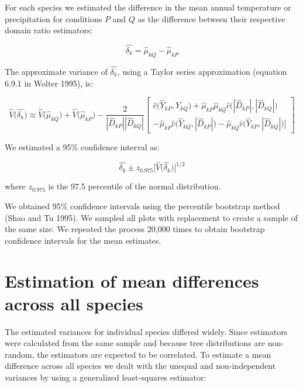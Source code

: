 \documentclass[12pt]{article}
\begin{document}
For each species we estimated the difference in the mean annual temperature or precipitation for conditions $P$ and $Q$ as the difference between their respective domain ratio estimators:

 \begin{equation} \label{eq:delta}
\hat{\delta_k} = \hat\mu_{kQ} - \hat\mu_{kP}
\end{equation}

The approximate variance of $\hat{\delta_k}$, using a Taylor series approximation (equation 6.9.1 in Wolter 1995), is: 

 \begin{equation} \label{eq:grandvar}
\hat{V}\big(\hat{\delta_k}\big) \approx \hat{V}\big(\hat\mu_{kQ}\big) + \hat{V}\big(\hat\mu_{kP}\big) - \frac{2}{|\hat{D}_{kP}||\hat{D}_{kQ}|} 
\begin{bmatrix}  \hat{c}\big( \hat{Y}_{kP}, \hat{Y}_{kQ} \big) + \hat{\mu}_{kP}\hat{\mu}_{kQ}\hat{c}\big( |\hat{D}_{kP}|, |\hat{D}_{kQ}| \big) \\ - \hat{\mu}_{kP}\hat{c}\big( \hat{Y}_{kQ}, |\hat{D}_{kP}| \big)  - \hat{\mu}_{kQ}\hat{c}\big( \hat{Y}_{kP}, |\hat{D}_{kQ}| \big)  \Big]
\end{bmatrix}
\end{equation}

We estimated a 95\% confidence interval as:

\begin{equation} \label{eq:ci}
\hat{\delta_k} \pm z_{0.975} \Big[\hat{V}\Big(\hat{\delta_k} \Big)\Big]^{1/2}
\end{equation}

where $z_{0.975}$ is the 97.5 percentile of the normal distribution.  

We obtained 95\% confidence intervals using the percentile bootstrap method (Shao and Tu 1995).   We sampled all plots with replacement to create a sample of the same size.  We repeated the process 20,000 times to obtain bootstrap confidence intervals for the mean estimates. 

\section*{Estimation of mean differences across all species} 
The estimated variances for individual species differed widely.  Since estimators were calculated from the same sample and because tree distributions are non-random, the estimators are expected to be correlated.  To estimate a mean difference across all species we dealt with the unequal and non-independent variances by using a generalized least-squares estimator:
\end{document}
